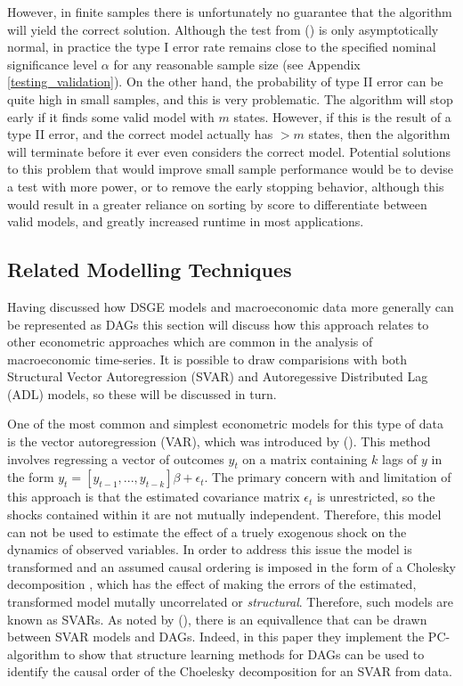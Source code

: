 \documentclass{article}
\begin{document}
However, in finite samples there is unfortunately no guarantee that the algorithm will yield the correct solution. Although the test from \citeauthor{srivastava2005some} (\citeyear{srivastava2005some}) is only asymptotically normal, in practice the type I error rate remains close to the specified nominal significance level $\alpha$ for any reasonable sample size (see Appendix \ref{testing_validation}). On the other hand, the probability of type II error can be quite high in small samples, and this is very problematic. The algorithm will stop early if it finds some valid model with $m$ states. However, if this is the result of a type II error, and the correct model actually has $>m$ states, then the algorithm will terminate before it ever even considers the correct model. Potential solutions to this problem that would improve small sample performance would be to devise a test with more power, or to remove the early stopping behavior, although this would result in a greater reliance on sorting by score to differentiate between valid models, and greatly increased runtime in most applications.

\subsection{Related Modelling Techniques}

Having discussed how DSGE models and macroeconomic data more generally can be represented as DAGs this section will discuss how this approach relates to other econometric approaches which are common in the analysis of macroeconomic time-series. It is possible to draw comparisions with both Structural Vector Autoregression (SVAR) and Autoregessive Distributed Lag (ADL) models, so these will be discussed in turn.

One of the most common and simplest econometric models for this type of data is the vector autoregression (VAR), which was introduced by \citeauthor{sims1980macroeconomics} (\citeyear{sims1980macroeconomics}). This method involves regressing a vector of outcomes $y_t$ on a matrix containing $k$ lags of $y$ in the form $y_t = [y_{t-1}, ..., y_{t-k}] \beta + \epsilon_t $. The primary concern with and limitation of this approach is that the estimated covariance matrix $\epsilon_t$ is unrestricted, so the shocks contained within it are not mutually independent. Therefore, this model can not be used to estimate the effect of a truely exogenous shock on the dynamics of observed variables. In order to address this issue the model is transformed and an assumed causal ordering is imposed in the form of a Cholesky decomposition \parencite{sims1980macroeconomics}, which has the effect of making the errors of the estimated, transformed model mutally uncorrelated or \textit{structural}. Therefore, such models are known as SVARs. As noted by \citeauthor{demiralp2003searching} (\citeyear{demiralp2003searching}), there is an equivallence that can be drawn between SVAR models and DAGs. Indeed, in this paper they implement the PC-algorithm \parencite{spirtes1991algorithm} to show that structure learning methods for DAGs can be used to identify the causal order of the Choelesky decomposition for an SVAR from data.
\end{document}
